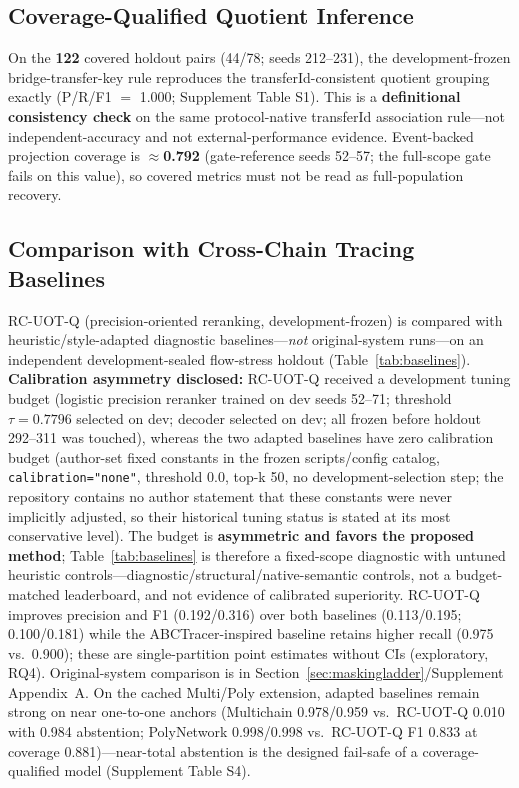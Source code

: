 \subsection{Coverage-Qualified Quotient Inference}
\label{sec:coveredquotient}

On the \textbf{122} covered holdout pairs (44/78; seeds 212--231), the development-frozen bridge-transfer-key rule reproduces the transferId-consistent quotient grouping exactly (P/R/F1 $=$ 1.000; Supplement Table S1). This is a \textbf{definitional consistency check} on the same protocol-native transferId association rule---not independent-accuracy and not external-performance evidence. Event-backed projection coverage is $\approx$\textbf{0.792} (gate-reference seeds 52--57; the full-scope gate fails on this value), so covered metrics must not be read as full-population recovery.

\subsection{Comparison with Cross-Chain Tracing Baselines}
\label{sec:baselines}

RC-UOT-Q (precision-oriented reranking, development-frozen) is compared with heuristic/style-adapted diagnostic baselines---\emph{not} original-system runs---on an independent development-sealed flow-stress holdout (Table~\ref{tab:baselines}). \textbf{Calibration asymmetry disclosed:} RC-UOT-Q received a development tuning budget (logistic precision reranker trained on dev seeds 52--71; threshold $\tau=0.7796$ selected on dev; decoder selected on dev; all frozen before holdout 292--311 was touched), whereas the two adapted baselines have zero calibration budget (author-set fixed constants in the frozen scripts/config catalog, \texttt{calibration="none"}, threshold 0.0, top-k 50, no development-selection step; the repository contains no author statement that these constants were never implicitly adjusted, so their historical tuning status is stated at its most conservative level). The budget is \textbf{asymmetric and favors the proposed method}; Table~\ref{tab:baselines} is therefore a fixed-scope diagnostic with untuned heuristic controls---diagnostic/structural/native-semantic controls, not a budget-matched leaderboard, and not evidence of calibrated superiority. RC-UOT-Q improves precision and F1 (0.192/0.316) over both baselines (0.113/0.195; 0.100/0.181) while the ABCTracer-inspired baseline retains higher recall (0.975 vs.\ 0.900); these are single-partition point estimates without CIs (exploratory, RQ4). Original-system comparison is in Section~\ref{sec:maskingladder}/Supplement Appendix~A. On the cached Multi/Poly extension, adapted baselines remain strong on near one-to-one anchors (Multichain 0.978/0.959 vs.\ RC-UOT-Q 0.010 with 0.984 abstention; PolyNetwork 0.998/0.998 vs.\ RC-UOT-Q F1 0.833 at coverage 0.881)---near-total abstention is the designed fail-safe of a coverage-qualified model (Supplement Table S4).

